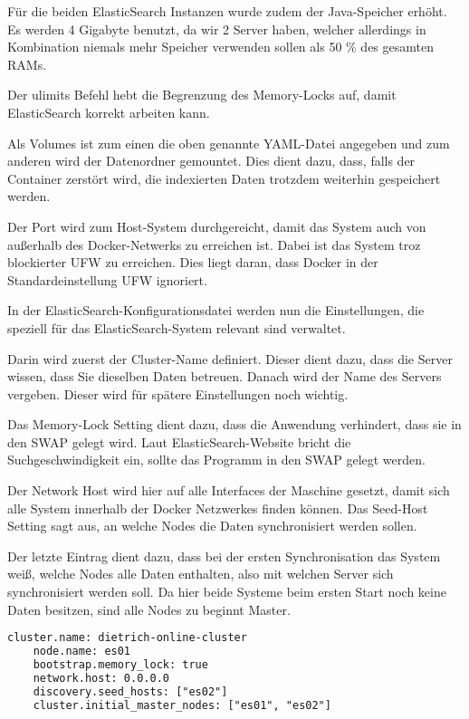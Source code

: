 Für die beiden ElasticSearch Instanzen wurde zudem der Java-Speicher erhöht. Es werden 4 Gigabyte benutzt, da wir 2 Server haben, welcher allerdings in Kombination niemals mehr Speicher verwenden sollen als 50 \% des gesamten RAMs. \cite{ElasticsearchB.V..12172019}

Der ulimits Befehl hebt die Begrenzung des Memory-Locks auf, damit ElasticSearch korrekt arbeiten kann.

Als Volumes ist zum einen die oben genannte YAML-Datei angegeben und zum anderen wird der Datenordner gemountet. Dies dient dazu, dass, falls der Container zerstört wird, die indexierten Daten trotzdem weiterhin gespeichert werden.

Der Port wird zum Host-System durchgereicht, damit das System auch von außerhalb des Docker-Netwerks zu erreichen ist. Dabei ist das System troz blockierter UFW zu erreichen. Dies liegt daran, dass Docker in der Standardeinstellung UFW ignoriert.

In der ElasticSearch-Konfigurationsdatei werden nun die Einstellungen, die speziell für das ElasticSearch-System relevant sind verwaltet. 

Darin wird zuerst der Cluster-Name definiert. Dieser dient dazu, dass die Server wissen, dass Sie dieselben Daten betreuen. 
Danach wird der Name des Servers vergeben. Dieser wird für spätere Einstellungen noch wichtig.

Das Memory-Lock Setting dient dazu, dass die Anwendung verhindert, dass sie in den SWAP gelegt wird. Laut ElasticSearch-Website bricht die Suchgeschwindigkeit ein, sollte das Programm in den SWAP gelegt werden.

Der Network Host wird hier auf alle Interfaces der Maschine gesetzt, damit sich alle System innerhalb der Docker Netzwerkes finden können.
Das Seed-Host Setting sagt aus, an welche Nodes die Daten synchronisiert werden sollen.

Der letzte Eintrag dient dazu, dass bei der ersten Synchronisation das System weiß, welche Nodes alle Daten enthalten, also mit welchen Server sich synchronisiert werden soll. Da hier beide Systeme beim ersten Start noch keine Daten besitzen, sind alle Nodes zu beginnt Master. 
\begin{lstlisting}[language=XML, frame=single, label={lst:es01-yml}] 
	cluster.name: dietrich-online-cluster
	node.name: es01
	bootstrap.memory_lock: true
	network.host: 0.0.0.0
	discovery.seed_hosts: ["es02"]
	cluster.initial_master_nodes: ["es01", "es02"]
\end{lstlisting}

